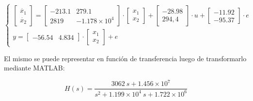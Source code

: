 \vspace{-0.5cm}
\begin{equation}
    \begin{cases}
        \begin{bmatrix}
            \dot{x_1}\\
            \dot{x_2}
        \end{bmatrix}
        =
        \begin{bmatrix}
            -213.1  &   279.1\\
            2819    &   -1.178\times 10^4
        \end{bmatrix}
        \cdot
        \begin{bmatrix}
            x_1 \\
            x_2
        \end{bmatrix}
        +
        \begin{bmatrix}
            -28.98 \\
            294,4
        \end{bmatrix}
        \cdot
        u 
        +
        \begin{bmatrix}
            -11.92 \\
            -95.37
        \end{bmatrix}
        \cdot
        e
        \\
        y =
        \begin{bmatrix}
            -56.54 & 4.834
        \end{bmatrix}
        \cdot
        \begin{bmatrix}
            x_1 \\
            x_2
        \end{bmatrix}
        +
        e

    \end{cases}
\end{equation}

El mismo se puede representar en función de transferencia luego de transformarlo mediante MATLAB:

\vspace{-0.5cm}
\begin{equation}
    H(s) = \dfrac{3062\ s + 1.456 \times 10^7}{s^2 + 1.199 \times 10^4\ s + 1.722 \times 10^6}
\end{equation}
\vspace{-0.5cm}